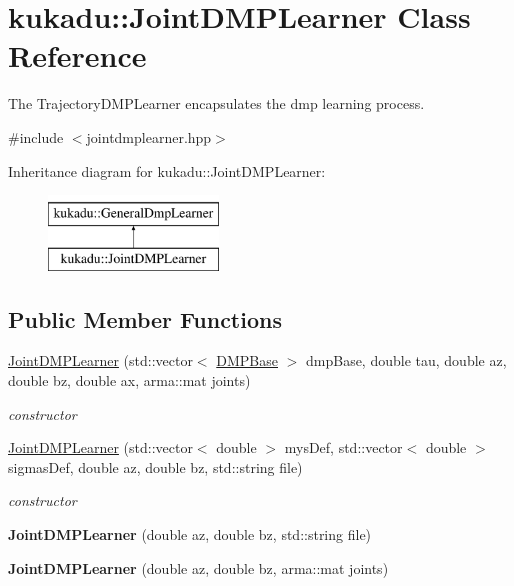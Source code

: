 \hypertarget{classkukadu_1_1JointDMPLearner}{\section{kukadu\-:\-:Joint\-D\-M\-P\-Learner Class Reference}
\label{classkukadu_1_1JointDMPLearner}
}


The Trajectory\-D\-M\-P\-Learner encapsulates the dmp learning process.  




{\ttfamily \#include $<$jointdmplearner.\-hpp$>$}

Inheritance diagram for kukadu\-:\-:Joint\-D\-M\-P\-Learner\-:\begin{figure}[H]
\begin{center}
\leavevmode
\includegraphics[height=2.000000cm]{classkukadu_1_1JointDMPLearner}
\end{center}
\end{figure}
\subsection*{Public Member Functions}
\begin{DoxyCompactItemize}
\item 
\hyperlink{classkukadu_1_1JointDMPLearner_aeafe6581d82892f4038e0087f80c48c9}{Joint\-D\-M\-P\-Learner} (std\-::vector$<$ \hyperlink{classkukadu_1_1DMPBase}{D\-M\-P\-Base} $>$ dmp\-Base, double tau, double az, double bz, double ax, arma\-::mat joints)
\begin{DoxyCompactList}\small\item\em constructor \end{DoxyCompactList}\item 
\hyperlink{classkukadu_1_1JointDMPLearner_a0831ec240ee08b99bef99d4e2806f31f}{Joint\-D\-M\-P\-Learner} (std\-::vector$<$ double $>$ mys\-Def, std\-::vector$<$ double $>$ sigmas\-Def, double az, double bz, std\-::string file)
\begin{DoxyCompactList}\small\item\em constructor \end{DoxyCompactList}\item 
\hypertarget{classkukadu_1_1JointDMPLearner_a40e29048662ca3a660993654e36db047}{{\bfseries Joint\-D\-M\-P\-Learner} (double az, double bz, std\-::string file)}\label{classkukadu_1_1JointDMPLearner_a40e29048662ca3a660993654e36db047}

\item 
\hypertarget{classkukadu_1_1JointDMPLearner_a96029d28387b06bba16bc2ccd3965cae}{{\bfseries Joint\-D\-M\-P\-Learner} (double az, double bz, arma\-::mat joints)}\label{classkukadu_1_1JointDMPLearner_a96029d28387b06bba16bc2ccd3965cae}

\end{DoxyCompactItemize}
